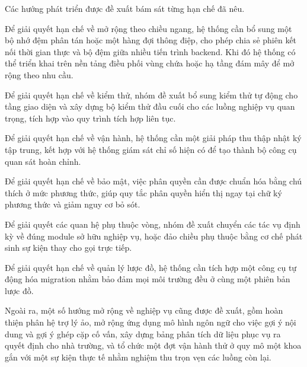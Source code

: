 \documentclass[12pt,a4paper,oneside]{report}
\begin{document}
Các hướng phát triển được đề xuất bám sát từng hạn chế đã nêu.

Để giải quyết hạn chế về mở rộng theo chiều ngang, hệ thống cần bổ sung một bộ nhớ đệm phân tán hoặc một hàng đợi thông điệp, cho phép chia sẻ phiên kết nối thời gian thực và bộ đệm giữa nhiều tiến trình backend. Khi đó hệ thống có thể triển khai trên nền tảng điều phối vùng chứa hoặc hạ tầng đám mây để mở rộng theo nhu cầu.

Để giải quyết hạn chế về kiểm thử, nhóm đề xuất bổ sung kiểm thử tự động cho tầng giao diện và xây dựng bộ kiểm thử đầu cuối cho các luồng nghiệp vụ quan trọng, tích hợp vào quy trình tích hợp liên tục.

Để giải quyết hạn chế về vận hành, hệ thống cần một giải pháp thu thập nhật ký tập trung, kết hợp với hệ thống giám sát chỉ số hiện có để tạo thành bộ công cụ quan sát hoàn chỉnh.

Để giải quyết hạn chế về bảo mật, việc phân quyền cần được chuẩn hóa bằng chú thích ở mức phương thức, giúp quy tắc phân quyền hiển thị ngay tại chữ ký phương thức và giảm nguy cơ bỏ sót.

Để giải quyết các quan hệ phụ thuộc vòng, nhóm đề xuất chuyển các tác vụ định kỳ về đúng module sở hữu nghiệp vụ, hoặc đảo chiều phụ thuộc bằng cơ chế phát sinh sự kiện thay cho gọi trực tiếp.

Để giải quyết hạn chế về quản lý lược đồ, hệ thống cần tích hợp một công cụ tự động hóa migration nhằm bảo đảm mọi môi trường đều ở cùng một phiên bản lược đồ.

Ngoài ra, một số hướng mở rộng về nghiệp vụ cũng được đề xuất, gồm hoàn thiện phân hệ trợ lý ảo, mở rộng ứng dụng mô hình ngôn ngữ cho việc gợi ý nội dung và gợi ý ghép cặp cố vấn, xây dựng bảng phân tích dữ liệu phục vụ ra quyết định cho nhà trường, và tổ chức một đợt vận hành thử ở quy mô một khoa gắn với một sự kiện thực tế nhằm nghiệm thu trọn vẹn các luồng còn lại.
\end{document}
